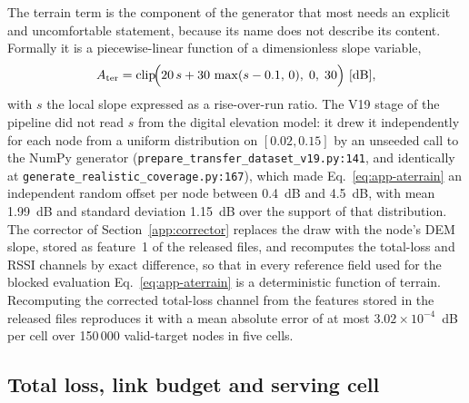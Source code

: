 The terrain term is the component of the generator that most needs an
explicit and uncomfortable statement, because its name does not describe
its content. Formally it is a piecewise-linear function of a dimensionless
slope variable,
\begin{equation}
A_{\mathrm{ter}} = \operatorname{clip}\!\Bigl(
20\,s + 30\,\max(s-0.1,\,0),\; 0,\; 30 \Bigr)\ [\mathrm{dB}] ,
\label{eq:app-aterrain}
\end{equation}
with $s$ the local slope expressed as a rise-over-run ratio. The V19 stage
of the pipeline did not read $s$ from the digital elevation model: it drew
it independently for each node from a uniform distribution on $[0.02, 0.15]$
by an unseeded call to the NumPy generator
(\texttt{prepare\_\allowbreak{}transfer\_\allowbreak{}dataset\_\allowbreak{}v19.py:\allowbreak{}141}, and identically at
\texttt{generate\_\allowbreak{}realistic\_\allowbreak{}coverage\allowbreak{}.py:\allowbreak{}167}), which made
Eq.~\eqref{eq:app-aterrain} an independent random offset per node between
0.4~dB and 4.5~dB, with mean 1.99~dB and standard deviation 1.15~dB over the
support of that distribution. The corrector of Section~\ref{app:corrector}
replaces the draw with the node's DEM slope, stored as feature~1 of the
released files, and recomputes the total-loss and RSSI channels by exact
difference, so that in every reference field used for the blocked evaluation
Eq.~\eqref{eq:app-aterrain} is a deterministic function of terrain.
Recomputing the corrected total-loss channel from the features stored in the
released files reproduces it with a mean absolute error of at most
$3.02 \times 10^{-4}$~dB per cell over 150\,000 valid-target nodes in five cells.

\subsection{Total loss, link budget and serving cell}

